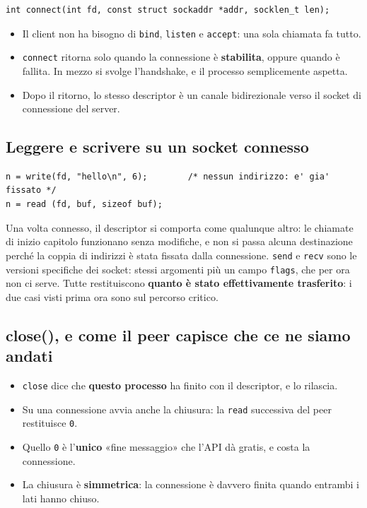 \begin{lstlisting}[language={[POSIX]C}]
int connect(int fd, const struct sockaddr *addr, socklen_t len);
\end{lstlisting}

\begin{itemize}
    \item Il client non ha bisogno di \texttt{bind}, \texttt{listen} e \texttt{accept}: una sola chiamata fa tutto.
    \item \texttt{connect} ritorna solo quando la connessione è \textbf{stabilita}, oppure quando è fallita. In mezzo si
          svolge l'handshake, e il processo semplicemente aspetta.
    \item Dopo il ritorno, lo stesso descriptor è un canale bidirezionale verso il socket di connessione del server.
\end{itemize}

\subsection{Leggere e scrivere su un socket connesso}

\begin{lstlisting}[language={[POSIX]C}]
n = write(fd, "hello\n", 6);        /* nessun indirizzo: e' gia' fissato */
n = read (fd, buf, sizeof buf);
\end{lstlisting}

Una volta connesso, il descriptor si comporta come qualunque altro: le chiamate di inizio capitolo funzionano senza
modifiche, e non si passa alcuna destinazione perché la coppia di indirizzi è stata fissata dalla connessione.
\texttt{send} e \texttt{recv} sono le versioni specifiche dei socket: stessi argomenti più un campo \texttt{flags}, che
per ora non ci serve. Tutte restituiscono \textbf{quanto è stato effettivamente trasferito}: i due casi visti prima ora
sono sul percorso critico.

\subsection{close(), e come il peer capisce che ce ne siamo andati}

\begin{itemize}
    \item \texttt{close} dice che \textbf{questo processo} ha finito con il descriptor, e lo rilascia.
    \item Su una connessione avvia anche la chiusura: la \texttt{read} successiva del peer restituisce \texttt{0}.
    \item Quello \texttt{0} è l'\textbf{unico} «fine messaggio» che l'API dà gratis, e costa la connessione.
    \item La chiusura è \textbf{simmetrica}: la connessione è davvero finita quando entrambi i lati hanno chiuso.
\end{itemize}


